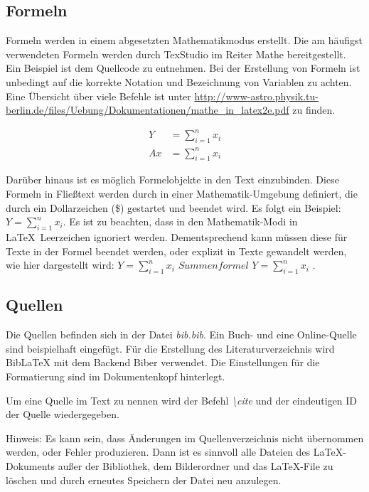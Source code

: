 \documentclass[13pt,a4paper, listof=entryprefix, bibliography=totocnumbered,toc=listofnumbered,lof=listofnumbered]{scrartcl}
\newcounter{verzeichnis}
\begin{document}
\subsection{Formeln}
\label{ch:Formeln}
Formeln werden in einem abgesetzten Mathematikmodus erstellt. Die am häufigst verwendeten Formeln werden durch TexStudio im Reiter Mathe bereitgestellt. Ein Beispiel ist dem Quellcode zu entnehmen. Bei der Erstellung von Formeln ist unbedingt auf die korrekte Notation und Bezeichnung von Variablen zu achten. Eine Übersicht über viele Befehle ist unter \url{http://www-astro.physik.tu-berlin.de/files/Uebung/Dokumentationen/mathe_in_latex2e.pdf} zu finden.

\begin{fleqn}[1.25cm]
	\begin{align*}
		Y  & = \sum_{i=1}^{n} x_{i} \\
		Ax & = \sum_{i=1}^{n} x_{i}
	\end{align*}
\end{fleqn}

Darüber hinaus ist es möglich Formelobjekte in den Text einzubinden. Diese Formeln in Fließtext werden durch in einer Mathematik-Umgebung definiert, die durch ein Dollarzeichen (\$) gestartet und beendet wird. Es folgt ein Beispiel: $Y = \sum_{i=1}^{n} x_{i}$. Es ist zu beachten, dass in den Mathematik-Modi in \LaTeX \ Leerzeichen ignoriert werden. Dementsprechend kann müssen diese für Texte in der Formel beendet werden, oder explizit in Texte gewandelt werden, wie hier dargestellt wird: $Y = \sum_{i=1}^{n} x_{i} \textit{ Summenformel } Y = \sum_{i=1}^{n} x_{i}$ .


\subsection{Quellen}
\label{ch:quellen}
Die Quellen befinden sich in der Datei \textit{bib.bib}. Ein Buch- und eine Online-Quelle sind beispielhaft eingefügt. Für die Erstellung des Literaturverzeichnis wird BibLaTeX mit dem Backend Biber verwendet. Die Einstellungen für die Formatierung sind im Dokumentenkopf hinterlegt.

Um eine Quelle im Text zu nennen wird der Befehl \textit{\textbackslash cite} und der eindeutigen ID der Quelle wiedergegeben. \cite{Herrmann.2009}

Hinweis: Es kann sein, dass Änderungen im Quellenverzeichnis nicht übernommen werden, oder Fehler produzieren. Dann ist es sinnvoll alle Dateien des \LaTeX-Dokuments außer der Bibliothek, dem Bilderordner und das \LaTeX-File zu löschen und durch erneutes Speichern der Datei neu anzulegen.
\end{document}
